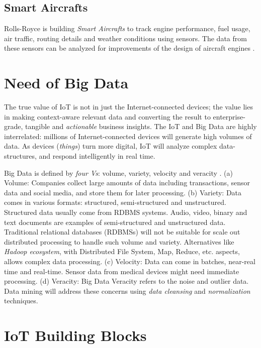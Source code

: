 \documentclass[sigconf]{acmart}
\begin{document}
	\subsection{Smart Aircrafts}
	
	Rolls-Royce is building {\em Smart Aircrafts} to track engine performance, fuel usage, air traffic, routing details and weather conditions using sensors. The data from these sensors can be analyzed for improvements of the design of aircraft engines \cite{smart-aircraft}.	

	\section{Need of Big Data}
	
	The true value of IoT is not in just the Internet-connected devices; the value lies in making context-aware relevant data and converting the result to enterprise-grade, tangible and {\em actionable} business insights. The IoT and Big Data are highly interrelated: millions of Internet-connected devices will generate high volumes of data. As devices ({\em things}) turn more digital, IoT will analyze complex data-structures, and respond intelligently in real time. 
	
	Big Data is defined by {\em four Vs}: volume, variety, velocity and veracity \cite{big-data}. (a) Volume: Companies collect large amounts of data including transactions, sensor data and social media, and store them for later processing. (b) Variety: Data comes in various formats: structured, semi-structured and unstructured. Structured data usually come from RDBMS systems. Audio, video, binary and text documents are examples of semi-structured and unstructured data. Traditional relational databases (RDBMSs) will not be suitable for scale out distributed processing to handle such volume and variety. Alternatives like {\em Hadoop ecosystem}, with Distributed File System, Map, Reduce, etc. aspects, allows complex data processing. (c) Velocity: Data can come in batches, near-real time and real-time. Sensor data from medical devices might need immediate processing. (d) Veracity: Big Data Veracity refers to the noise and outlier data. Data mining will address these concerns using {\em data cleansing} and {\em normalization} techniques.
	

	\section{IoT Building Blocks}
	
\end{document}
